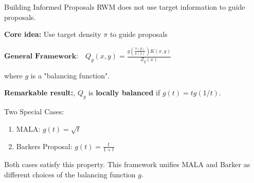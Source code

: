 
\begin{frame}{Building Informed Proposals}
	RWM does not use target information to guide proposals.

	\textbf{Core idea:} Use target density $\pi$ to guide proposals

	\vspace{0.3cm}
	$\textbf{General Framework:} \quad Q_{g}(x,y) = \frac{g\left( \frac{\pi(y)}{\pi(x)}  \right)K(x,y)}{Z_g(x)}$
	
	\vspace{0.3cm}
	where $g$ is a "balancing function".

	\vspace{0.3cm}
	\textbf{Remarkable result:}, $Q_g$ is \textbf{locally balanced} if $g(t) = tg(1/t)$.

	\vspace{0.3cm}
	Two Special Cases:
	\begin{enumerate}
		\item MALA: $g(t) = \sqrt{t}$ 
		\item Barkers Proposal: $g(t) = \frac{t}{1+t}$
	\end{enumerate}
	Both cases satisfy this property. This framework unifies MALA and Barker as different
	choices of the balancing function $g$.
\end{frame}

